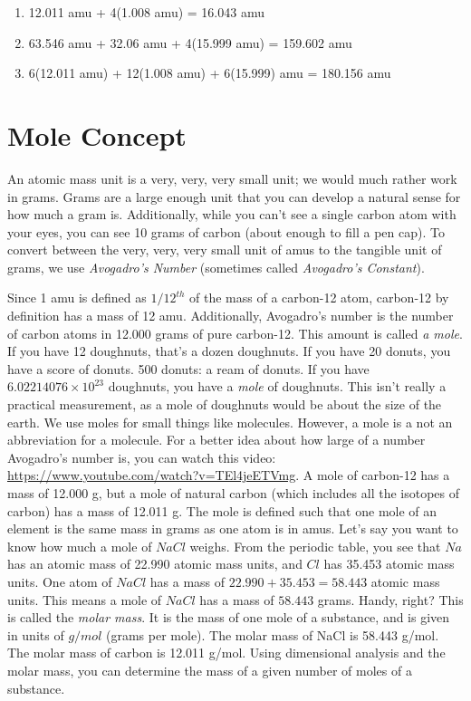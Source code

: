 \begin{Answer}[ref = molecular]
\begin{enumerate}
\item 12.011 amu + 4(1.008 amu) = 16.043 amu
\item 63.546 amu + 32.06 amu + 4(15.999 amu) = 159.602 amu
\item 6(12.011 amu) + 12(1.008 amu) + 6(15.999) amu = 180.156 amu
\end{enumerate}
\end{Answer}

\section{Mole Concept}

An atomic mass unit is a very, very, very small unit; we would much rather work in
grams. Grams are a large enough unit that you can develop a natural sense for how 
much a gram is. Additionally, while you can't see a single carbon atom with your 
eyes, you can see 10 grams of carbon (about enough to fill a pen cap). To convert
between the very, very, very small unit of amus to the tangible unit of grams, we 
use \textit{Avogadro's Number} (sometimes called \textit{Avogadro's Constant}).

Since 1 amu is defined as $1/12^{th}$ of the mass of a carbon-12 atom, carbon-12 
by definition has a mass of 12 amu. Additionally, Avogadro's number is the number 
of carbon atoms in 12.000 grams of pure carbon-12. This amount is called \textit{a
mole}. If you have 12 doughnuts, that's a dozen doughnuts. If you have 20 donuts, 
you have a score of donuts. 500 donuts: a ream of donuts. If you have $6.02214076 
\times 10^{23}$ doughnuts, you have a \textit{mole} of doughnuts. This isn't 
really a practical measurement, as a mole of doughnuts would be about the size of 
the earth. We use moles for small things like molecules. However, a mole is a not an abbreviation for a molecule. For a better 
idea about how large of a number Avogadro's number is, you can watch this video: 
\url{https://www.youtube.com/watch?v=TEl4jeETVmg}. 
A mole of carbon-12 has a mass of 12.000 g, but a mole of natural carbon (which
includes all the isotopes of carbon) has a mass of 12.011 g. The mole is defined 
such that one mole of an element is the same mass in grams as one atom is in amus.
Let's say you want to know how much a mole of $NaCl$ weighs. From the periodic 
table, you see that $Na$ has an atomic mass of 22.990 atomic mass units, and $Cl$ 
has 35.453 atomic mass units. One atom of $NaCl$ has a mass of $22.990 + 35.453 = 
58.443$ atomic mass units. This means a mole of $NaCl$ has a mass of $58.443$ 
grams. Handy, right? This is called the \textit{molar mass}. It is the mass of one
mole of a substance, and is given in units of $g/mol$ (grams per mole). The molar 
mass of NaCl is 58.443 g/mol. The molar mass of carbon is 12.011 g/mol. Using 
dimensional analysis and the molar mass, you can determine the mass of a given 
number of moles of a substance. 

